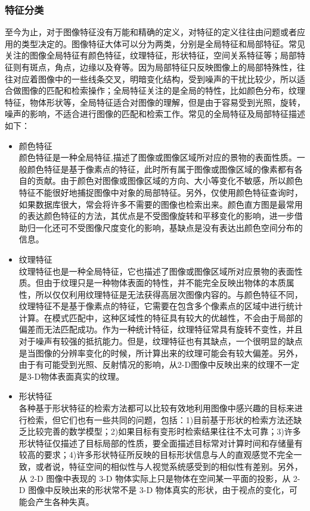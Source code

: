 \subsubsection{特征分类}
至今为止，对于图像特征没有万能和精确的定义，对特征的定义往往由问题或者应用的类型决定的。图像特征大体可以分为两类，分别是全局特征和局部特征。常见关注的图像全局特征有颜色特征，纹理特征，形状特征，空间关系特征等；局部特征则有斑点，角点，边缘以及脊等。因为局部特征只反映图像上的局部特殊性，往往对应着图像中的一些线条交叉，明暗变化结构，受到噪声的干扰比较少，所以适合做图像的匹配和检索操作；全局特征关注的是全局的特性，比如颜色分布，纹理特征，物体形状等，全局特征适合对图像的理解，但是由于容易受到光照，旋转，噪声的影响，不适合进行图像的匹配和检索工作。常见的全局特征及局部特征描述如下：
\begin{itemize}
\item 颜色特征\\颜色特征是一种全局特征,描述了图像或图像区域所对应的景物的表面性质。一般颜色特征是基于像素点的特征，此时所有属于图像或图像区域的像素都有各自的贡献。由于颜色对图像或图像区域的方向、大小等变化不敏感，所以颜色特征不能很好地捕捉图像中对象的局部特征。另外，仅使用颜色特征查询时，如果数据库很大，常会将许多不需要的图像也检索出来。颜色直方图是最常用的表达颜色特征的方法，其优点是不受图像旋转和平移变化的影响，进一步借助归一化还可不受图像尺度变化的影响，基缺点是没有表达出颜色空间分布的信息。
\item 纹理特征\\纹理特征也是一种全局特征，它也描述了图像或图像区域所对应景物的表面性质。但由于纹理只是一种物体表面的特性，并不能完全反映出物体的本质属性，所以仅仅利用纹理特征是无法获得高层次图像内容的。与颜色特征不同，纹理特征不是基于像素点的特征，它需要在包含多个像素点的区域中进行统计计算。在模式匹配中，这种区域性的特征具有较大的优越性，不会由于局部的偏差而无法匹配成功。作为一种统计特征，纹理特征常具有旋转不变性，并且对于噪声有较强的抵抗能力。但是，纹理特征也有其缺点，一个很明显的缺点是当图像的分辨率变化的时候，所计算出来的纹理可能会有较大偏差。另外，由于有可能受到光照、反射情况的影响，从2-D图像中反映出来的纹理不一定是3-D物体表面真实的纹理。
\item 形状特征\\各种基于形状特征的检索方法都可以比较有效地利用图像中感兴趣的目标来进行检索，但它们也有一些共同的问题，包括：1)目前基于形状的检索方法还缺乏比较完善的数学模型；2)如果目标有变形时检索结果往往不太可靠；3)许多形状特征仅描述了目标局部的性质，要全面描述目标常对计算时间和存储量有较高的要求；4)许多形状特征所反映的目标形状信息与人的直观感觉不完全一致，或者说，特征空间的相似性与人视觉系统感受到的相似性有差别。另外，从 2-D 图像中表现的 3-D 物体实际上只是物体在空间某一平面的投影，从 2-D 图像中反映出来的形状常不是 3-D 物体真实的形状，由于视点的变化，可能会产生各种失真。

\end{itemize}
